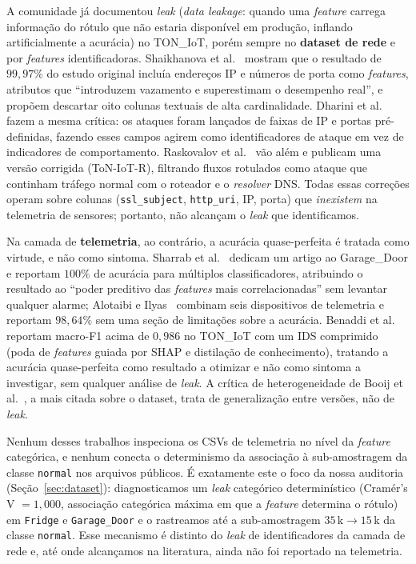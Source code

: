 A comunidade já documentou \emph{leak} (\emph{data leakage}: quando
uma \emph{feature} carrega informação do rótulo que não estaria
disponível em produção, inflando artificialmente a acurácia) no
TON\_IoT, porém sempre no \textbf{dataset de rede} e por
\emph{features} identificadoras. Shaikhanova et al.~\cite{shaikhanova2025audit}
mostram que o resultado de $99{,}97\%$ do estudo original incluía
endereços IP e números de porta como \emph{features}, atributos que
``introduzem vazamento e superestimam o desempenho real'', e propõem
descartar oito colunas textuais de alta cardinalidade. Dharini et
al.~\cite{dharini2026efficient} fazem a mesma crítica: os ataques foram
lançados de faixas de IP e portas pré-definidas, fazendo esses campos
agirem como identificadores de ataque em vez de indicadores de
comportamento. Raskovalov et al.~\cite{raskovalov2022rectification} vão
além e publicam uma versão corrigida (ToN-IoT-R), filtrando fluxos
rotulados como ataque que continham tráfego normal com o roteador e o
\emph{resolver} DNS. Todas essas correções operam sobre colunas
(\texttt{ssl\_subject}, \texttt{http\_uri}, IP, porta) que
\emph{inexistem} na telemetria de sensores; portanto, não alcançam o
\emph{leak} que identificamos.

Na camada de \textbf{telemetria}, ao contrário, a acurácia
quase-perfeita é tratada como virtude, e não como sintoma. Sharrab et
al.~\cite{sharrab2025analysis} dedicam um artigo ao Garage\_Door e
reportam $100\%$ de acurácia para múltiplos classificadores, atribuindo
o resultado ao ``poder preditivo das \emph{features} mais
correlacionadas'' sem levantar qualquer alarme; Alotaibi e
Ilyas~\cite{alotaibi2023stacking} combinam seis dispositivos de
telemetria e reportam $98{,}64\%$ sem uma seção de limitações sobre a
acurácia. Benaddi et al.~\cite{benaddi2025near} reportam macro-F1 acima
de $0{,}986$ no TON\_IoT com um IDS comprimido (poda de \emph{features}
guiada por SHAP e distilação de conhecimento), tratando a acurácia
quase-perfeita como resultado a otimizar e não como sintoma a
investigar, sem qualquer análise de \emph{leak}. A crítica de
heterogeneidade de Booij et al.~\cite{booij2022heterogeneity}, a mais
citada sobre o dataset, trata de generalização entre versões, não de
\emph{leak}.

Nenhum desses trabalhos inspeciona os CSVs de telemetria no nível da
\emph{feature} categórica, e nenhum conecta o determinismo da
associação à sub-amostragem da classe \texttt{normal} nos arquivos
públicos. É exatamente este o foco da nossa auditoria
(Seção~\ref{sec:dataset}): diagnosticamos um \emph{leak} categórico
determinístico (Cramér's V $=1{,}000$, associação categórica máxima
em que a \emph{feature} determina o rótulo) em \texttt{Fridge} e
\texttt{Garage\_Door} e o rastreamos até a sub-amostragem
$35\,\text{k} \rightarrow 15\,\text{k}$ da classe \texttt{normal}.
Esse mecanismo é distinto do \emph{leak} de identificadores da camada
de rede e, até onde alcançamos na literatura, ainda não foi reportado
na telemetria.

